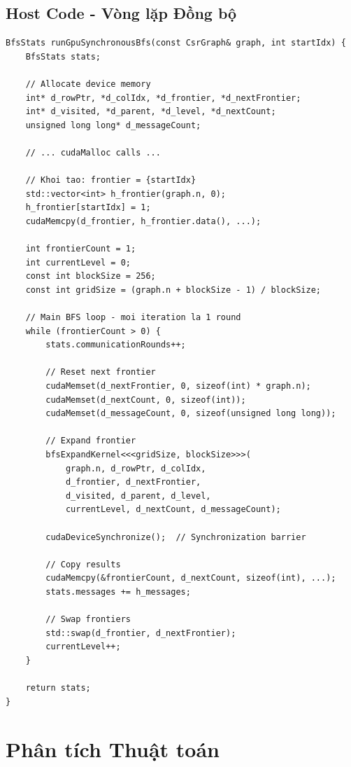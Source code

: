 \subsection{Host Code - Vòng lặp Đồng bộ}

\begin{lstlisting}[caption={GPU BFS với Synchronous Rounds}, label={lst:bfs_host}]
BfsStats runGpuSynchronousBfs(const CsrGraph& graph, int startIdx) {
    BfsStats stats;
    
    // Allocate device memory
    int* d_rowPtr, *d_colIdx, *d_frontier, *d_nextFrontier;
    int* d_visited, *d_parent, *d_level, *d_nextCount;
    unsigned long long* d_messageCount;
    
    // ... cudaMalloc calls ...
    
    // Khoi tao: frontier = {startIdx}
    std::vector<int> h_frontier(graph.n, 0);
    h_frontier[startIdx] = 1;
    cudaMemcpy(d_frontier, h_frontier.data(), ...);
    
    int frontierCount = 1;
    int currentLevel = 0;
    const int blockSize = 256;
    const int gridSize = (graph.n + blockSize - 1) / blockSize;
    
    // Main BFS loop - moi iteration la 1 round
    while (frontierCount > 0) {
        stats.communicationRounds++;
        
        // Reset next frontier
        cudaMemset(d_nextFrontier, 0, sizeof(int) * graph.n);
        cudaMemset(d_nextCount, 0, sizeof(int));
        cudaMemset(d_messageCount, 0, sizeof(unsigned long long));
        
        // Expand frontier
        bfsExpandKernel<<<gridSize, blockSize>>>(
            graph.n, d_rowPtr, d_colIdx,
            d_frontier, d_nextFrontier,
            d_visited, d_parent, d_level,
            currentLevel, d_nextCount, d_messageCount);
        
        cudaDeviceSynchronize();  // Synchronization barrier
        
        // Copy results
        cudaMemcpy(&frontierCount, d_nextCount, sizeof(int), ...);
        stats.messages += h_messages;
        
        // Swap frontiers
        std::swap(d_frontier, d_nextFrontier);
        currentLevel++;
    }
    
    return stats;
}
\end{lstlisting}

\section{Phân tích Thuật toán}

